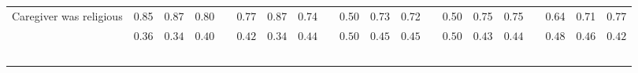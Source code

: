 \begin{center}
{\begin{longtable}{L{6cm} c c c p{.5cm} c c c p{.5cm} c c c p{.5cm} c c c p{.5cm} c c c}
 \quad Caregiver was religious & 0.85 &      0.87 &      0.80 & &      0.77 &      0.87 &      0.74 & &      0.50 &      0.73 &      0.72 & &      0.50 &      0.75 &      0.75 & &      0.64 &      0.71 &      0.77 \\*
 \quad & $\mathit{     0.36}$ & $\mathit{     0.34}$ & $\mathit{     0.40}$ & & $\mathit{     0.42}$ & $\mathit{     0.34}$ & $\mathit{     0.44}$ & & $\mathit{     0.50}$ & $\mathit{     0.45}$ & $\mathit{     0.45}$ & & $\mathit{     0.50}$ & $\mathit{     0.43}$ & $\mathit{     0.44}$ & & $\mathit{     0.48}$ & $\mathit{     0.46}$ & $\mathit{     0.42}$ \\[.2em]
 ~\\[-.5em]
\hline
\end{longtable}
}
\end{center}
